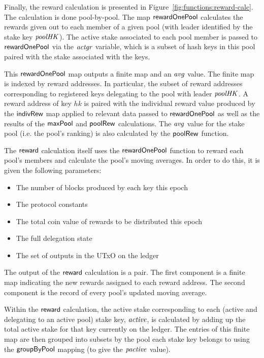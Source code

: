 Finally, the reward calculation is presented in
Figure~\ref{fig:functions:reward-calc}. The calculation is done pool-by-pool.
The map $\mathsf{rewardOnePool}$ calculates the rewards given out to each member
of a given pool (with leader identified by
the stake key $\mathit{poolHK}$). The active stake associated to each
pool member is passed to $\mathsf{rewardOnePool}$
via the $\mathit{actgr}$ variable, which is a subset of hash keys in this pool
paired with the stake associated with the keys.

This $\mathsf{rewardOnePool}$ map outputs a finite map and an $\mathit{avg}$
value. The finite map is indexed
by reward addresses. In particular, the subset of reward addresses corresponding
to registered keys delegating to the pool with leader $\mathit{poolHK}$.
A reward address of key $hk$ is paired with the individual reward value
produced by the $\mathsf{indivRew}$ map applied to relevant data passed to
$\mathsf{rewardOnePool}$ as well as the results of the $\mathsf{maxPool}$
and $\mathsf{poolRew}$ calculations. The $\mathit{avg}$ value for the stake pool
(i.e. the pool's ranking) is also calculated by the $\mathsf{poolRew}$ function.

The $\mathsf{reward}$ calculation itself uses the $\mathsf{rewardOnePool}$ function to
reward each pool's members and calculate the pool's moving averages. In order to
do this, it is given the following parameters:

\begin{itemize}
\item The number of blocks produced by each key this epoch
\item The protocol constants
\item The total coin value of rewards to be distributed this epoch
\item The full delegation state
\item The set of outputs in the UTxO on the ledger
\end{itemize}

The output of the $\mathsf{reward}$ calculation is a pair. The first component is
a finite map indicating the new rewards assigned to each reward address.
The second component is the record of every pool's updated moving average.

Within the $\mathsf{reward}$ calculation, the active stake corresponding to each
(active and delegating to an active pool) stake key, $\mathit{active}$, is
calculated by adding up the total active stake for that key currently on the
ledger. The entries of this finite map are then grouped into subsets by the pool
each stake key belongs to using the $\mathsf{groupByPool}$ mapping (to give the
$\mathit{pactive}$ value).


